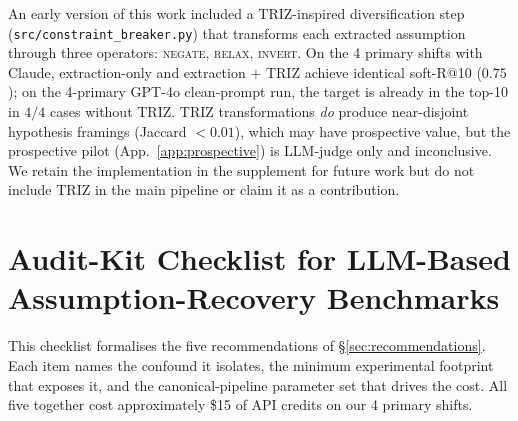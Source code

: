 \documentclass[11pt]{article}
\begin{document}
An early version of this work included a TRIZ-inspired diversification step (\texttt{src/constraint\_breaker.py}) that transforms each extracted assumption through three operators: \textsc{negate}, \textsc{relax}, \textsc{invert}. On the 4 primary shifts with Claude, extraction-only and extraction $+$ TRIZ achieve identical soft-R@10 ($0.75$); on the 4-primary GPT-4o clean-prompt run, the target is already in the top-10 in $4/4$ cases without TRIZ. TRIZ transformations \emph{do} produce near-disjoint hypothesis framings (Jaccard $<0.01$), which may have prospective value, but the prospective pilot (App.~\ref{app:prospective}) is LLM-judge only and inconclusive. We retain the implementation in the supplement for future work but do not include TRIZ in the main pipeline or claim it as a contribution.

\section{Audit-Kit Checklist for LLM-Based Assumption-Recovery Benchmarks}\label{app:checklist}

This checklist formalises the five recommendations of \S\ref{sec:recommendations}. Each item names the confound it isolates, the minimum experimental footprint that exposes it, and the canonical-pipeline parameter set that drives the cost. All five together cost approximately \$15 of API credits on our 4 primary shifts.
\end{document}
